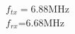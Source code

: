 \documentclass[preview]{standalone}
\begin{document}
\begin{center}
$f_{tx}=$6.88MHz\\$f_{rx}$=6.68MHz
\end{center}
\end{document}
